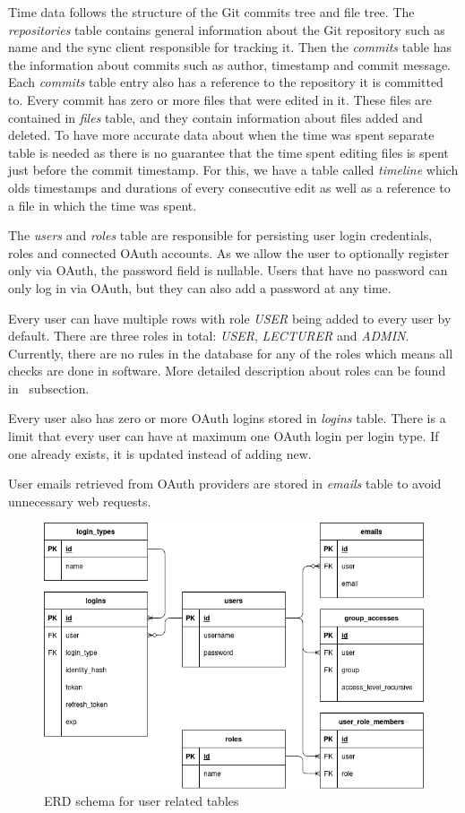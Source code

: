 Time data follows the structure of the Git commits tree and file tree.
The \textit{repositories} table contains general information about the Git repository such as name and the sync client
responsible for tracking it.
Then the \textit{commits} table has the information about commits such as author, timestamp and commit message.
Each \textit{commits} table entry also has a reference to the repository it is committed to.
Every commit has zero or more files that were edited in it.
These files are contained in \textit{files} table, and they contain information about files added and deleted.
To have more accurate data about when the time was spent separate table is needed as there is no guarantee that
the time spent editing files is spent just before the commit timestamp.
For this, we have a table called \textit{timeline} which olds timestamps and durations of every consecutive edit as
well as a reference to a file in which the time was spent.

The \textit{users} and \textit{roles} table are responsible for persisting user login credentials, roles and connected OAuth accounts.
As we allow the user to optionally register only via OAuth, the password field is nullable.
Users that have no password can only log in via OAuth, but they can also add a password at any time.

Every user can have multiple rows with role \textit{USER} being added to every user by default.
There are three roles in total: \textit{USER}, \textit{LECTURER} and \textit{ADMIN}.
Currently, there are no rules in the database for any of the roles which means all checks are done in software.
More detailed description about roles can be found in~ subsection.

Every user also has zero or more OAuth logins stored in \textit{logins} table.
There is a limit that every user can have at maximum one OAuth login per login type.
If one already exists, it is updated instead of adding new.

User emails retrieved from OAuth providers are stored in \textit{emails} table to avoid unnecessary web requests.

\begin{figure}[H]
    \includegraphics[width=\textwidth]{figures/erd_schema_user}
    \caption{ERD schema for user related tables}
    \label{fig:erd-schema-user}
\end{figure}

